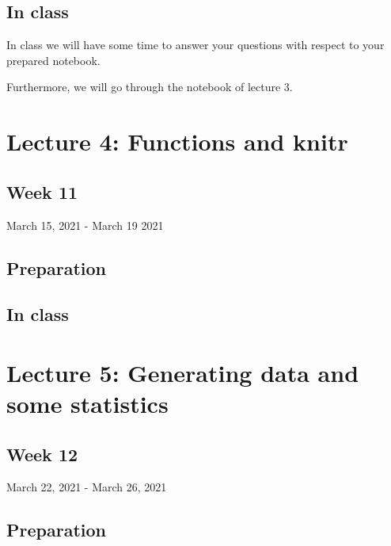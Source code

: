\documentclass[
]{book}
\begin{document}
\hypertarget{in-class-2}{%
\subsection{In class}\label{in-class-2}}

In class we will have some time to answer your questions with respect to your prepared notebook.

Furthermore, we will go through the notebook of lecture 3.

\hypertarget{lecture-4-functions-and-knitr}{%
\section{Lecture 4: Functions and knitr}\label{lecture-4-functions-and-knitr}}

\hypertarget{week-11}{%
\subsection{Week 11}\label{week-11}}

March 15, 2021 - March 19 2021

\hypertarget{preparation-3}{%
\subsection{Preparation}\label{preparation-3}}

\hypertarget{in-class-3}{%
\subsection{In class}\label{in-class-3}}

\hypertarget{lecture-5-generating-data-and-some-statistics}{%
\section{Lecture 5: Generating data and some statistics}\label{lecture-5-generating-data-and-some-statistics}}

\hypertarget{week-12}{%
\subsection{Week 12}\label{week-12}}

March 22, 2021 - March 26, 2021

\hypertarget{preparation-4}{%
\subsection{Preparation}\label{preparation-4}}
\end{document}
